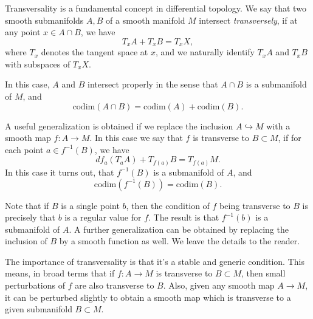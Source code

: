 \documentclass[12pt]{article}
\begin{document}
Transversality is a fundamental concept in differential topology. We say that two smooth submanifolds $A,B$ of a smooth manifold $M$ intersect \emph{transversely}, if at any point $x\in A\cap B$, we have
\[ T_x A + T_x B = T_x X, \]
where $T_x$ denotes the tangent space at $x$, and we naturally identify $T_x A$ and $T_x B$ with subspaces of $T_x X$. 

In this case, $A$ and $B$ intersect properly in the sense that $A\cap B$ is a submanifold of $M$, and
\[ \mathrm{codim}(A\cap B) = \mathrm{codim}(A) + \mathrm{codim}(B). \]

A useful generalization is obtained if we replace the inclusion $A\hookrightarrow M$ with a smooth map $f:A\to M$. In this case we say that $f$ is transverse to $B\subset M$, if for each point $a\in f^{-1}(B)$, we have
\[ df_a(T_a A) + T_{f(a)}B = T_{f(a)}M. \]
In this case it turns out, that $f^{-1}(B)$ is a submanifold of $A$, and
\[ \mathrm{codim}(f^{-1}(B)) = \mathrm{codim}(B).\]

Note that if $B$ is a single point $b$, then the condition of $f$ being transverse to $B$ is precisely that $b$ is a regular value for $f$. The result is that $f^{-1}(b)$ is a submanifold of $A$. A further generalization can be obtained by replacing the inclusion of $B$ by a smooth function as well. We leave the details to the reader. 

The importance of transversality is that it's a stable and generic condition. This means, in broad terms that if $f:A\to M$ is transverse to $B\subset M$, then small perturbations of $f$ are also transverse to $B$. Also, given any smooth map $A\to M$, it can be perturbed slightly to obtain a smooth map which is transverse to a given submanifold $B\subset M$.
\end{document}

